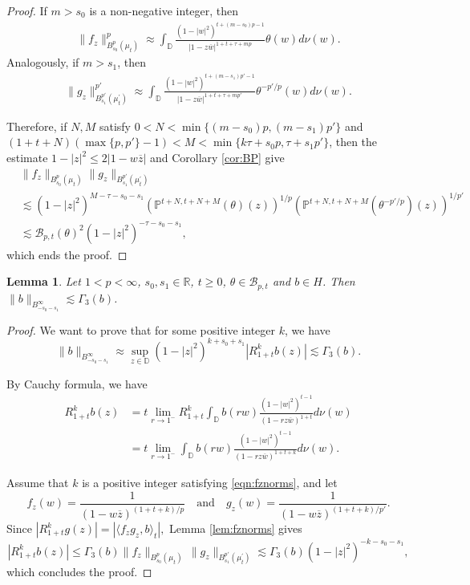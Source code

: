 \documentclass[12pt,twoside,leqno,final]{amsart}
\theoremstyle{plain}
\newtheorem{lem}[thm]{Lemma}
\begin{document}
\begin{proof}
If $m>s_0$ is a non-negative integer, then 
\begin{align*}
\|f_z\|_{B^p_{s_0}(\mu_t)}^p\approx 
\int_{{\mathbb D}} \frac{(1-|w|^2)^{t+(m-s_0)p-1}}{|1-z\overline w|^{1+t+\tau+mp}}\theta(w)d\nu(w).
\end{align*}
Analogously, if $m>s_1$, then 
\begin{align*}
\|g_z\|_{B^{p'}_{s_1}(\mu^{\prime}_t)}^{p'}\approx
\int_{{\mathbb D}} \frac{(1-|w|^2)^{t+(m-s_1)p'-1}}{|1-z\overline w|^{1+t+\tau+mp'}}\theta^{-p'/p}(w)d\nu(w).
\end{align*}

Therefore, if $N,M$ satisfy $0<N<\min\{(m-s_0)p,(m-s_1)p'\}$ and $(1+t+N)(\max\{p,p'\}-1)<M<\min\{k\tau+s_0p,\tau+s_1p'\}$, then 
the estimate $1-|z|^2\le 2|1-w\overline z|$ and Corollary \ref{cor:BP} give
\begin{align*}
&\|f_z\|_{B^p_{s_0}(\mu_t)}\|g_z\|_{B^{p'}_{s_1}(\mu^{\prime}_t)}\\
&\lesssim (1-|z|^2)^{M-\tau-s_0-s_1}
\left({\mathbb{P}}^{t+N,t+N+M}(\theta)(z)\right)^{1/p}\left({\mathbb{P}}^{t+N,t+N+M}(\theta^{-p'/p})(z)\right)^{1/p'}\\
&\lesssim {{\mathcal B}}_{p,t}(\theta)^2 (1-|z|^2)^{-\tau-s_0-s_1},
\end{align*}
which ends the proof.
\end{proof}

\begin{lem} \label{lem:BinG3}
Let $1<p<\infty$, $s_0,s_1\in{{\mathbb R}}$, $t\ge 0$, $\theta\in {{\mathcal B}}_{p,t}$ and $b\in H$.  Then
$\|b\|_{B^\infty_{-s_0-s_1}}\lesssim \Gamma_3(b)$.
\end{lem}

\begin{proof}
We want to prove that for some positive integer $k$, we have 
$$
\|b\|_{B^\infty_{-s_0-s_1}}\approx \sup_{z\in{{\mathbb D}}}(1-|z|^2)^{k+s_0+s_1}|R^k_{1+t} b(z)|\lesssim \Gamma_3(b).
$$

By Cauchy formula, we have
\begin{align*}
R^k_{1+t} b(z)&=t\lim_{r\to1^{-}}R^k_{1+t}\int_{{\mathbb D}} b(rw) 
\frac{(1-|w|^2)^{t-1}}{(1-rz\overline  w)^{1+t}}d\nu(w)\\
&=t\lim_{r\to1^{-}}\int_{{\mathbb D}} b(rw) 
\frac{(1-|w|^2)^{t-1}}{(1-rz\overline  w)^{1+t+k}}d\nu(w).
\end{align*} 

Assume that $k$ is a positive integer satisfying  \eqref{eqn:fznorms}, and let 
$$
f_z(w)= \frac{1}{(1-w\overline z)^{(1+t+k)/p}}
\quad\text{and}\quad
g_z(w)= \frac{1}{(1-w\overline z)^{(1+t+k)/p'}}.
$$
Since
$
|R^k_{1+t} g(z)|=|\langle f_zg_z,b\rangle_t|, 
$
Lemma \ref{lem:fznorms} gives 
$$
|R^k_{1+t} b(z)|\le \Gamma_3(b)
\|f_z\|_{B^p_{s_0}(\mu_t)}\,\|g_z\|_{B^{p'}_{s_1}(\mu^\prime_t)}
\lesssim \Gamma_3(b)(1-|z|^2)^{-k-s_0-s_1},
$$
which concludes the proof.
\end{proof}
\end{document}
